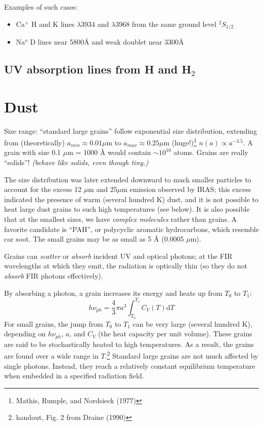 \documentclass[12pt]{article}
\newcommand{\mar}[1]{\hspace{0pt}\marginpar{-\textcolor{black}{#1}-}}
\newcommand{\mynotes}[1]{{\fontfamily{cmss}\selectfont \textit{#1}}}
\let\oldsection\section
\renewcommand\section{\clearpage\oldsection}
\begin{document}
Examples of such cases:
\begin{itemize}
    \item Ca$^{+}$ H and K lines $\lambda$3934 and $\lambda$3968 from the
        same ground level $^{2}S_{1/2}$
    \item Na$^{o}$ D lines near 5800\AA{} and weak doublet near 3300\AA{}
\end{itemize}

\subsection{UV absorption lines from H and H$_{2}$}
\mar{96}


\section{Dust}
\mar{104}Size range: ``standard large grains'' follow exponential size
distribution, extending from (theoretically) $a_{min} \approx 0.01 \mu$m to
$a_{max} \approx 0.25 \mu$m (huge!)\footnote{Mathis, Rumple, and Nordsieck
(1977)} $n(a) \propto a^{-3.5}$. A grain with size 0.1 $\mu$m = 1000 \AA{}
would contain $\sim 10^{10}$ atoms. Grains are really ``solids''!
\mynotes{(behave like solids, even though tiny.)}

The size distribution was later extended downward to much smaller particles to
account for the excess 12 $\mu$m and 25$\mu$m emission observed by IRAS; this
excess indicated the presence of warm (several hundred K) dust, and it is not
possible to heat large dust grains to such high temperatures (see below). It is
also possible that at the smallest sizes, we have \textit{complex molecules}
rather than grains. A favorite candidate is ``PAH'', or polycyclic aromatic
hydrocarbons, which resemble car soot. The small grains may be as small as 5
\AA{} (0.0005 $\mu$m).

Grains can \emph{scatter} or \emph{absorb} incident UV and optical photons; at
the FIR wavelengths at which they emit, the radiation is optically thin (so
they do not \mar{105} \emph{absorb} FIR photons effectively).

By absorbing a photon, a grain increases its energy and heats up from
$T_{0}$ to $T_{1}$:
\[
    h\nu_{ph} = \frac{4}{3}{\pi}a^{3} \int_{T_{0}}^{T_{1}} {
        C_{V} (T) \mathrm{d}T }
    \]
For small grains, the jump from $T_{0}$ to $T_{1}$ can be very large
(several hundred K), depending on $h\nu_{ph}$, $a$, and $C_{V}$ (the heat
capacity per unit volume). These grains are said to be stochastically
heated to high temperatures. As a result, the grains are found over a wide
range in $T$.\footnote{handout, Fig. 2 from Draine (1990)}
Standard large grains are not much affected by single photons. Instead, they
reach a relatively constant equilibrium temperature when embedded in a
specified radiation field.
\end{document}
